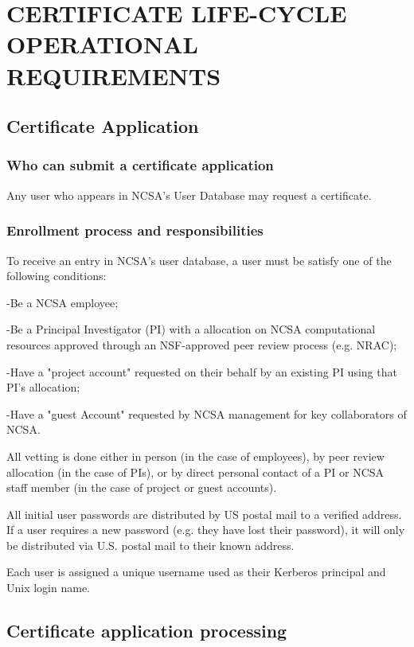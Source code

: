\documentclass[10pt]{article}
\begin{document}
\section{CERTIFICATE LIFE-CYCLE OPERATIONAL REQUIREMENTS}

\subsection{Certificate Application}

\subsubsection{Who can submit a certificate application}

Any user who appears in NCSA's User Database may request a
certificate.

\subsubsection{Enrollment process and responsibilities}

To receive an entry in NCSA’s user database, a user must be satisfy
one of the following conditions:

-Be a NCSA employee;

-Be a Principal Investigator (PI) with a allocation on NCSA
computational resources approved through an NSF-approved peer review
process (e.g. NRAC);

-Have a "project account" requested on their behalf by an existing PI
using that PI’s allocation;

-Have a "guest Account" requested by NCSA management for key
collaborators of NCSA.

All vetting is done either in person (in the case of employees), by
peer review allocation (in the case of PIs), or by direct personal
contact of a PI or NCSA staff member (in the case of project or guest
accounts).

All initial user passwords are distributed by US postal mail to a
verified address. If a user requires a new password (e.g. they have
lost their password), it will only be distributed via U.S. postal mail
to their known address.

Each user is assigned a unique username used as their Kerberos
principal and Unix login name.

\subsection{Certificate application processing}
\end{document}
